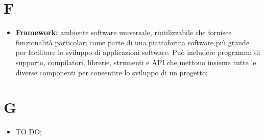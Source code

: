 %


\section*{F} %
\label{sec:f}
	\begin{itemize}
		\item \textbf{Framework:} ambiente software universale, riutilizzabile che fornisce funzionalità particolari come parte di una piattaforma software più grande per facilitare lo sviluppo di applicazioni software. Può includere programmi di supporto, compilatori, librerie, strumenti e API che mettono insieme tutte le diverse componenti per consentire lo sviluppo di un progetto;
	\end{itemize}
\pagebreak

\section*{G} %
\label{sec:g}
	\begin{itemize}
		\item TO DO;
	\end{itemize}
\pagebreak


